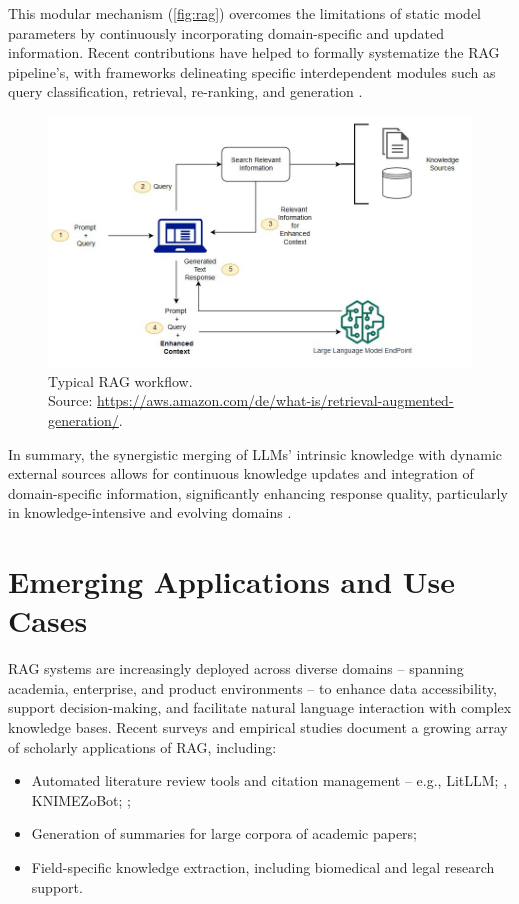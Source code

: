 \begin{spacing}{1.5}
This modular mechanism (\autoref{fig:rag}) overcomes the limitations of static model parameters by continuously incorporating domain-specific and updated information. Recent contributions have helped to formally systematize the RAG pipeline's, with frameworks delineating specific interdependent modules such as query classification, retrieval, re-ranking, and generation \parencite{wang_searching_2024}.

\vspace{0.5em}
\begin{figure}[H]
  \centering
  \includegraphics[width=\textwidth]{images/rag_workflow.jpg} 
  \caption{Typical RAG workflow.\\
  \footnotesize{Source: \url{https://aws.amazon.com/de/what-is/retrieval-augmented-generation/}.\nocite{noauthor_was_nodate}}}
  \label{fig:rag}
\end{figure}
\vspace{0.5em}

\noindent In summary, the synergistic merging of LLMs' intrinsic knowledge with dynamic external sources allows for continuous knowledge updates and integration of domain-specific information, significantly enhancing response quality, particularly in knowledge-intensive and evolving domains \parencite{wang_searching_2024, gao_retrieval-augmented_2024}.

\section{Emerging Applications and Use Cases}\label{sec:evol_qas}
RAG systems are increasingly deployed across diverse domains -- spanning academia, enterprise, and product environments -- to enhance data accessibility, support decision-making, and facilitate natural language interaction with complex knowledge bases. Recent surveys and empirical studies document a growing array of scholarly applications of RAG, including:
\begin{itemize}
    \item Automated literature review tools and citation management -- e.g., LitLLM; \citep{agarwal_litllm_2025}, KNIMEZoBot; \citep{alshammari_knimezobot_2023};
    \item Generation of summaries for large corpora of academic papers;
    \item Field-specific knowledge extraction, including biomedical and legal research support.
\end{itemize}


\end{spacing}

